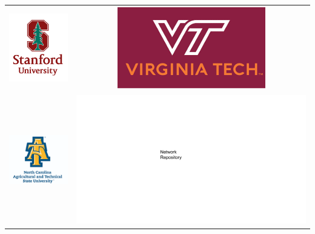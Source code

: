 \documentclass[landscape,paperwidth=70in,paperheight=46in,fontscale=0.225]{baposter} %
\begin{document}
\begin{poster}
{ 
\begin{tabular}{c c}
\includegraphics[scale=0.4]{logos/stanford.png} &
\includegraphics[scale=0.4]{logos/vt.png} \\
\includegraphics[scale=0.4]{logos/ncatnt.png} &
\includegraphics[trim = 3.7in 3.in 6in 3in, clip, scale=0.5]{logos/network-repos-logo.png} \\
\end{tabular}
}


\end{poster}
\end{document}
